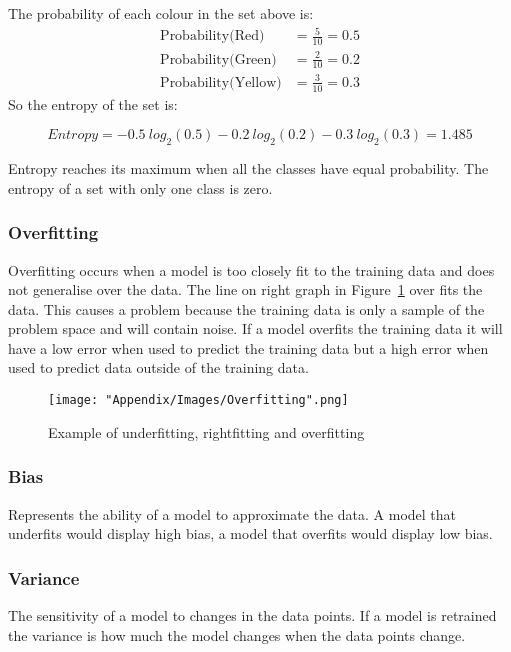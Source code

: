 		The probability of each colour in the set above is:
		\begin{align*}
			\text{Probability(Red)} &= \frac{5}{10} = 0.5\\
			\text{Probability(Green)} &= \frac{2}{10} = 0.2\\
			\text{Probability(Yellow)} &= \frac{3}{10} = 0.3
		\end{align*}		 
		So the entropy of the set is:
					
		$$Entropy = - 0.5\ log_2(0.5) - 0.2\ log_2(0.2) - 0.3\ log_2(0.3) = 1.485$$
		
		Entropy reaches its maximum when all the classes have equal probability. The entropy of a set with only one class is zero.
		
		\subsubsection{Overfitting}
		Overfitting occurs when a model is too closely fit to the training data and does not generalise over the data. The line on right graph in Figure~\ref{fig:overfitting} over fits the data. This causes a problem because the training data is only a sample of the problem space and will contain noise. If a model overfits the training data it will have a low error when used to predict the training data but a high error when used to predict data outside of the training data.
		
		\begin{figure}[H]
			\centering
			\texttt{[image: "Appendix/Images/Overfitting".png]}
			\caption{Example of underfitting, rightfitting and overfitting\cite{stackExchangeOverfitting}}
    			\label{fig:overfitting}
		\end{figure}	
		
		\subsubsection{Bias}
		Represents the ability of a model to approximate the data. A model that underfits would display high bias, a model that overfits would display low bias.
		
		\subsubsection{Variance}
		The sensitivity of a model to changes in the data points. If a model is retrained the variance is how much the model changes when the data points change.
				
